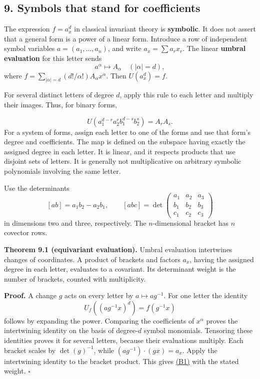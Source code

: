 \documentclass[
]{article}
\begin{document}
\subsection{9. Symbols that stand for coefficients}\label{section-9}

The expression \(f=a_x^d\) in classical invariant theory is
\textbf{symbolic}. It does not assert that a general form is a power of
a linear form. Introduce a row of independent symbol variables
\(a=(a_1,\ldots,a_n)\), and write \(a_x=\sum a_rx_r\). The linear
\textbf{umbral evaluation} for this letter sends \[
a^\alpha\longmapsto A_\alpha\quad (|\alpha|=d),
\] where \(f=\sum_{|\alpha|=d}(d!/\alpha!)A_\alpha x^\alpha\). Then
\(U(a_x^d)=f\).

For several distinct letters of degree \(d\), apply this rule to each
letter and multiply their images. Thus, for binary forms,
\protect{}\label{equation-B22}{}

\[
U(a_1^{d-r}a_2^r b_1^{d-s}b_2^s)=A_rA_s.
\tag{B22}
\] For a system of forms, assign each letter to one of the forms and use
that form's degree and coefficients. The map is defined on the subspace
having exactly the assigned degree in each letter. It is linear, and it
respects products that use disjoint sets of letters. It is generally not
multiplicative on arbitrary symbolic polynomials involving the same
letter.

Use the determinants \[
[ab]=a_1b_2-a_2b_1,\qquad
[abc]=\det\begin{pmatrix}a_1&a_2&a_3\\b_1&b_2&b_3\\c_1&c_2&c_3\end{pmatrix}
\] in dimensions two and three, respectively. The \(n\)-dimensional
bracket has \(n\) covector rows.

\protect{}\label{theorem-9-1}{}

\textbf{Theorem 9.1 (equivariant evaluation).} Umbral evaluation
intertwines changes of coordinates. A product of brackets and factors
\(a_x\), having the assigned degree in each letter, evaluates to a
covariant. Its determinant weight is the number of brackets, counted
with multiplicity.

\textbf{Proof.} A change \(g\) acts on every letter by
\(a\mapsto ag^{-1}\). For one letter the identity \[
U_f((ag^{-1}x)^d)=f(g^{-1}x)
\] follows by expanding the power. Comparing the coefficients of
\(x^\alpha\) proves the intertwining identity on the basis of
degree-\(d\) symbol monomials. Tensoring these identities proves it for
several letters, because their evaluations multiply. Each bracket scales
by \(\det(g)^{-1}\), while \((ag^{-1})\cdot(gx)=a_x\). Apply the
intertwining identity to the bracket product. This gives
\href{NOE-INV-01.html\#equation-B1}{(B1)} with the stated weight.
\(\square\)
\end{document}
